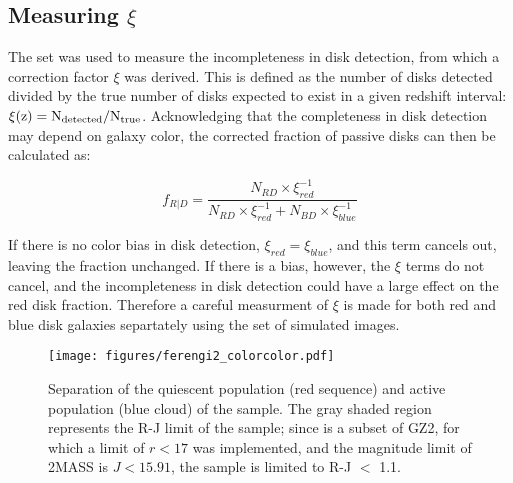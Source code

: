 \subsection{Measuring $\xi$}
\label{ssec:xi}

The  set was used to measure the incompleteness in disk detection, from which a correction factor $\xi$ was derived. This is defined as the number of disks detected divided by the true number of disks expected to exist in a given redshift interval: $\rm \xi(z)=N_{detected}/N_{true}$. Acknowledging that the completeness in disk detection may depend on galaxy color, the corrected fraction of passive disks can then be calculated as:

\begin{equation}
f_{R|D}=\frac{N_{RD}\times \xi^{-1}_{red}}{N_{RD}\times \xi^{-1}_{red} + N_{BD} \times \xi^{-1}_{blue}}
\label{eqn:fdir}
\end{equation}

If there is no color bias in disk detection, $\xi_{red}=\xi_{blue}$, and this term cancels out, leaving the fraction unchanged. If there is a bias, however, the $\xi$ terms do not cancel, and the incompleteness in disk detection could have a large effect on the red disk fraction. Therefore a careful measurment of $\xi$ is made for both red and blue disk galaxies separtately using the  set of simulated images.


\begin{figure}
\centering
\texttt{[image: figures/ferengi2\_colorcolor.pdf]}
\caption{Separation of the quiescent population (red sequence) and active population (blue cloud) of the  sample. The gray shaded region represents the R-J limit of the sample; since  is a subset of GZ2, for which a limit of $r<17$ was implemented, and the magnitude limit of 2MASS is $J<15.91$, the  sample is limited to R-J $<$ 1.1.}
\label{fig:ferengi2colorcolor}
\end{figure}


